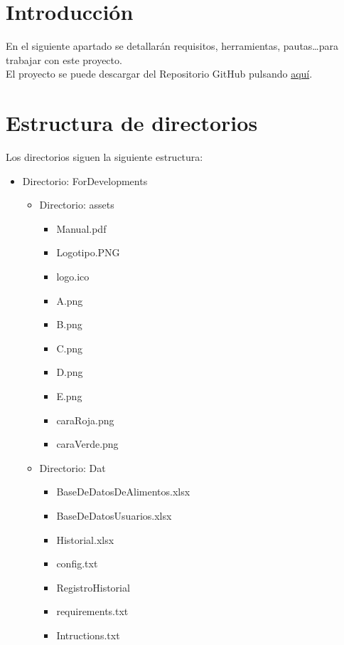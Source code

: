 
\section{Introducción}
En el siguiente apartado se detallarán requisitos, herramientas, pautas\ldots para trabajar con este proyecto.\\
El proyecto se puede descargar del Repositorio GitHub pulsando \href{https://github.com/jct0024/HealthApp}{aquí}.
\section{Estructura de directorios}
Los directorios siguen la siguiente estructura:
\begin{itemize}
\item Directorio: ForDevelopments
\begin{itemize}
\item Directorio: assets
\begin{itemize}
\item Manual.pdf
\item Logotipo.PNG
\item logo.ico
\item A.png
\item B.png
\item C.png
\item D.png
\item E.png
\item caraRoja.png
\item caraVerde.png
\end{itemize}
\item Directorio: Dat
\begin{itemize}
\item BaseDeDatosDeAlimentos.xlsx
\item BaseDeDatosUsuarios.xlsx
\item Historial.xlsx
\item config.txt
\item RegistroHistorial
\end{itemize}
\begin{itemize}
\item requirements.txt
\item Intructions.txt
\end{itemize}


\end{itemize}
\end{itemize}
